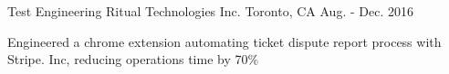 \begin{cventries}

\cventry
{Test Engineering} %
{Ritual Technologies Inc.} %
{Toronto, CA} %
{Aug. - Dec. 2016} %
{ %
\begin{cvitems}
\item {Engineered a chrome extension automating ticket dispute report process with Stripe. Inc, reducing
operations time by 70\%}
\end{cvitems}
}


\end{cventries}
